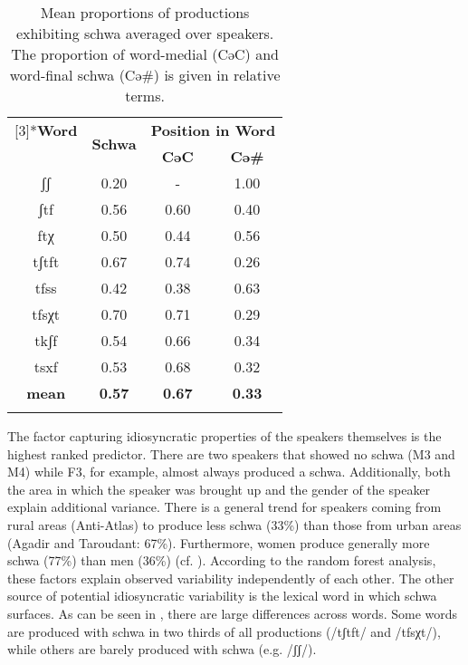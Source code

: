 \begin{table}[htbp]
  
    \begin{tabular}{cccc}
    \lsptoprule
    \multirow{2}[3]{*}{\textbf{Word}} & \multirow{2}[3]{*}{\textbf{Schwa}} & \multicolumn{2}{c}{\textbf{Position in Word}} \\
\cmidrule{3-4}  & & \textbf{CəC} & \textbf{Cə\#} \\
    \midrule
    ʃʃ    &          0.20    &              -      &          1.00    \\
    ʃtf   &          0.56    &          0.60    &          0.40    \\
    ftχ   &          0.50    &          0.44    &          0.56    \\
    tʃtft &          0.67    &          0.74    &          0.26    \\
    tfss  &          0.42    &          0.38    &          0.63    \\
    tfsχt &          0.70    &          0.71    &          0.29    \\
    tkʃf  &          0.54    &          0.66    &          0.34    \\
    tsxf  &          0.53    &          0.68    &          0.32    \\
    \midrule
    \textbf{mean} & \textbf{         0.57   } & \textbf{         0.67   } & \textbf{         0.33   } \\
    \lspbottomrule
    \end{tabular}
\caption{Mean proportions of productions exhibiting schwa averaged over speakers. The proportion of word-medial (CəC) and word-final schwa (Cə\#) is given in relative terms.}
  \label{tab:6.4}
\end{table}

The factor capturing idiosyncratic properties of the speakers themselves is the highest ranked predictor. There are two speakers that showed no schwa (M3 and M4) while F3, for example, almost always produced a schwa. Additionally, both the area in which the speaker was brought up and the gender of the speaker explain additional variance. There is a general trend for speakers coming from rural areas (Anti-Atlas) to produce less schwa (33\%) than those from urban areas (Agadir and Taroudant: 67\%). Furthermore, women produce generally more schwa (77\%) than men (36\%) (cf. ). According to the random forest analysis, these factors explain observed variability independently of each other. The other source of potential idiosyncratic variability is the lexical word in which schwa surfaces. As can be seen in , there are large differences across words. Some words are produced with schwa in two thirds of all productions (/tʃtft/ and /tfsχt/), while others are barely produced with schwa (e.g. /ʃʃ/).

